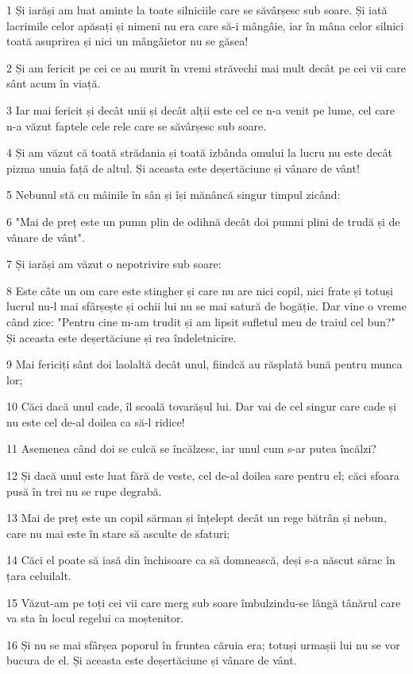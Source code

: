 \par 1 Și iarăși am luat aminte la toate silniciile care se săvârșesc sub soare. Și iată lacrimile celor apăsați și nimeni nu era care să-i mângâie, iar în mâna celor silnici toată asuprirea și nici un mângâietor nu se găsea!
\par 2 Și am fericit pe cei ce au murit în vremi străvechi mai mult decât pe cei vii care sânt acum în viață.
\par 3 Iar mai fericit și decât unii și decât alții este cel ce n-a venit pe lume, cel care n-a văzut faptele cele rele care se săvârșesc sub soare.
\par 4 Și am văzut că toată strădania și toată izbânda omului la lucru nu este decât pizma unuia față de altul. Și aceasta este deșertăciune și vânare de vânt!
\par 5 Nebunul stă cu mâinile în sân și își mănâncă singur timpul zicând:
\par 6 "Mai de preț este un pumn plin de odihnă decât doi pumni plini de trudă și de vânare de vânt".
\par 7 Și iarăși am văzut o nepotrivire sub soare:
\par 8 Este câte un om care este stingher și care nu are nici copil, nici frate și totuși lucrul nu-l mai sfârșește și ochii lui nu se mai satură de bogăție. Dar vine o vreme când zice: "Pentru cine m-am trudit și am lipsit sufletul meu de traiul cel bun?" Și aceasta este deșertăciune și rea îndeletnicire.
\par 9 Mai fericiți sânt doi laolaltă decât unul, fiindcă au răsplată bună pentru munca lor;
\par 10 Căci dacă unul cade, îl scoală tovarășul lui. Dar vai de cel singur care cade și nu este cel de-al doilea ca să-l ridice!
\par 11 Asemenea când doi se culcă se încălzesc, iar unul cum s-ar putea încălzi?
\par 12 Și dacă unul este luat fără de veste, cel de-al doilea sare pentru el; căci sfoara pusă în trei nu se rupe degrabă.
\par 13 Mai de preț este un copil sărman și înțelept decât un rege bătrân și nebun, care nu mai este în stare să asculte de sfaturi;
\par 14 Căci el poate să iasă din închisoare ca să domnească, deși s-a născut sărac în țara celuilalt.
\par 15 Văzut-am pe toți cei vii care merg sub soare îmbulzindu-se lângă tânărul care va sta în locul regelui ca moștenitor.
\par 16 Și nu se mai sfârșea poporul în fruntea căruia era; totuși urmașii lui nu se vor bucura de el. Și aceasta este deșertăciune și vânare de vânt.

